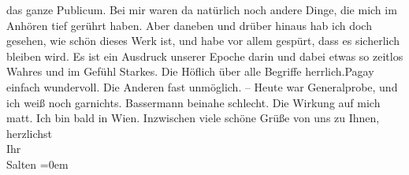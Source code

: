 \begin{ledgroupsized}[t]{13cm}
               das ganze Publicum. Bei mir waren da natürlich noch andere Dinge, die mich im Anhören
               tief gerührt haben. Aber daneben und drüber hinaus hab ich doch gesehen, wie schön
               dieses Werk ist, und habe vor allem gespürt, dass es sicherlich bleiben wird. Es ist
               ein Ausdruck unserer Epoche darin und dabei etwas so zeitlos Wahres und im Gefühl
               Starkes. Die Höflich über alle Begriffe herrlich.Pagay einfach wundervoll. Die Anderen fast unmöglich. –
               Heute war Generalprobe, und ich weiß noch garnichts. Bassermann beinahe schlecht. Die Wirkung auf mich matt.
               Ich bin bald in Wien. \pend
           \pstart
           Inzwischen viele schöne Grüße von uns zu Ihnen, herzlichst
               {\\[\baselineskip]}Ihr
               {\\[\baselineskip]}\spacefill\mbox{Salten}\pend
           \leftskip=0em{}
         
         \endnumbering{}\end{ledgroupsized}\begin{anhang}\end{anhang}\newcommand{\dateiname}{L03513}\newcommand{\titel}{Felix Salten an Arthur Schnitzler, 15. 10. 1907}\newcommand{\editorInnen}{Martin Anton Müller und Laura Untner}
      